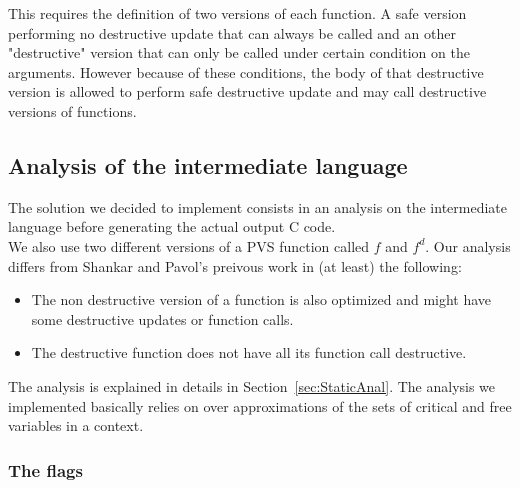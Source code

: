 \documentclass[12pt,a4paper]{article}
\begin{document}
This requires the definition of two versions of each function. A safe version performing no destructive update that can always be called and an other "destructive" version that can only be called under certain condition on the arguments. However because of these conditions, the body of that destructive version is allowed to perform safe destructive update and may call destructive versions of functions.


\subsection{Analysis of the intermediate language}
\label{Canalysis}

The solution we decided to implement consists in an analysis on the intermediate language before generating the actual output C code.\\

We also use two different versions of a PVS function called $f$ and $f^d$. Our analysis differs from Shankar and Pavol's preivous work in (at least) the following:
\begin{itemize}
\item The non destructive version of a function is also optimized and might have some destructive updates or function calls.
\item The destructive function does not have all its function call destructive.
\end{itemize}

The analysis is explained in details in Section~\ref{sec:StaticAnal}. The analysis we implemented basically relies on over approximations of the sets of critical and free variables in a context.

\subsubsection*{The flags}
\end{document}
